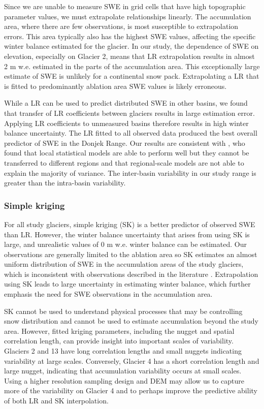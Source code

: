 \documentclass[twocolumn, letterpaper]{igs}
\begin{document}
Since we are unable to measure SWE in grid cells that have high topographic parameter values, we must extrapolate relationships linearly. The accumulation area, where there are few observations, is most susceptible to extrapolation errors. This area typically also has the highest SWE values, affecting the specific winter balance estimated for the glacier. In our study, the dependence of SWE on elevation, especially on Glacier 2, means that LR extrapolation results in almost 2 m w.e. estimated in the parts of the accumulation area. This exceptionally large estimate of SWE is unlikely for a continental snow pack. Extrapolating a LR that is fitted to predominantly ablation area SWE values is likely erroneous. 

While a LR can be used to predict distributed SWE in other basins, we found that transfer of LR coefficients between glaciers results in large estimation error. Applying LR coefficients to unmeasured basins therefore results in high winter balance uncertainty. The LR fitted to all observed data produced the best overall predictor of SWE in the Donjek Range. Our results are consistent with \cite{Grunewald2013}, who found that local statistical models are able to perform well but they cannot be transferred to different regions and that regional-scale models are not able to explain the majority of variance. The inter-basin variability in our study range is greater than the intra-basin variability. 

\subsubsection{Simple kriging}

For all study glaciers, simple kriging (SK) is a better predictor of observed SWE than LR. However, the winter balance uncertainty that arises from using SK is large, and unrealistic values of 0 m w.e. winter balance can be estimated. Our observations are generally limited to the ablation area so SK estimates an almost uniform distribution of SWE in the accumulation areas of the study glaciers, which is inconsistent with observations described in the literature \citep[e.g.][]{Machguth2006, Grabiec2011}. Extrapolation using SK leads to large uncertainty in estimating winter balance, which further emphasis the need for SWE observations in the accumulation area. 

SK cannot be used to understand physical processes that may be controlling snow distribution and cannot be used to estimate accumulation beyond the study area. However, fitted kriging parameters, including the nugget and spatial correlation length, can provide insight into important scales of variability. Glaciers 2 and 13 have long correlation lengths and small nuggets indicating variability at large scales. Conversely, Glacier 4 has a short correlation length and large nugget, indicating that accumulation variability occurs at small scales. Using a higher resolution sampling design and DEM may allow us to capture more of the variability on Glacier 4 and to perhaps improve the predictive ability of both LR and SK interpolation. 
\end{document}
